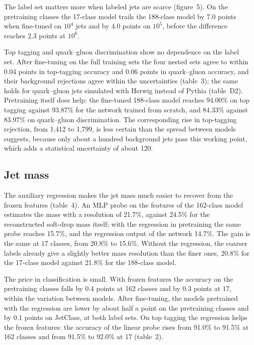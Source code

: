 \documentclass[11pt,a4paper]{article}
\newcommand{\bn}[1]{\textcolor{blue!70!black}{#1}}
\begin{document}
The label set matters more when labeled jets are scarce (figure~5).
On the pretraining classes the 17-class model trails the 188-class model by \bn{7.0} points when
fine-tuned on $10^4$ jets and by \bn{4.0} points on $10^5$, before the difference reaches
\bn{2.3} points at $10^6$.

Top tagging and quark--gluon discrimination show no dependence on the label set.
After fine-tuning on the full training sets the four nested sets agree to within \bn{0.04} points
in top-tagging accuracy and \bn{0.06} points in quark--gluon accuracy, and their background
rejections agree within the uncertainties (table~3); the same holds for quark--gluon jets
simulated with Herwig instead of Pythia (table~D2).
Pretraining itself does help: the fine-tuned 188-class model reaches \bn{94.00\%} on top tagging
against \bn{93.87\%} for the network trained from scratch, and \bn{84.33\%} against \bn{83.97\%}
on quark--gluon discrimination.
The corresponding rise in top-tagging rejection, from \bn{1,412} to \bn{1,799}, is less certain
than the spread between models suggests, because only about a hundred background jets pass this
working point, which adds a statistical uncertainty of about \bn{120}.

\subsection{Jet mass}

The auxiliary regression makes the jet mass much easier to recover from the frozen features
(table~4).
An MLP probe on the features of the 162-class model estimates the mass with a resolution of
\bn{21.7\%}, against \bn{24.5\%} for the reconstructed soft-drop mass itself; with the regression
in pretraining the same probe reaches \bn{15.7\%}, and the regression output of the network
\bn{14.7\%}.
The gain is the same at 17 classes, from \bn{20.8\%} to \bn{15.6\%}.
Without the regression, the coarser labels already give a slightly better mass resolution than
the finer ones, \bn{20.8\%} for the 17-class model against \bn{21.8\%} for the 188-class model.

The price in classification is small.
With frozen features the accuracy on the pretraining classes falls by \bn{0.4} points at 162
classes and by \bn{0.3} points at 17, within the variation between models.
After fine-tuning, the models pretrained with the regression are lower by about half a point on
the pretraining classes and by \bn{0.1} points on JetClass, at both label sets.
On top tagging the regression helps the frozen features: the accuracy of the linear probe rises
from \bn{91.0\%} to \bn{91.5\%} at 162 classes and from \bn{91.5\%} to \bn{92.0\%} at 17
(table~2).
\end{document}
